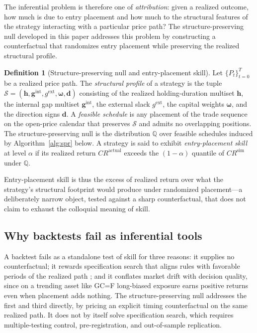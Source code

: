 \documentclass[preprint,12pt]{elsarticle}
\theoremstyle{definition}
\newtheorem{definition}{Definition}
\begin{document}
The inferential problem is therefore one of \emph{attribution}: given a realized outcome, how much is due to entry placement and how much to the structural features of the strategy interacting with a particular price path? The structure-preserving null developed in this paper addresses this problem by constructing a counterfactual that randomizes entry placement while preserving the realized structural profile.

\begin{definition}[Structure-preserving null and entry-placement skill]
Let $\{P_t\}_{t=0}^{T}$ be a realized price path. The \emph{structural profile} of a strategy is the tuple $\mathcal{S} = (\mathbf{h}, \mathbf{g}^{\mathrm{int}}, g^{\mathrm{ext}}, \boldsymbol{\omega}, \mathbf{d})$ consisting of the realized holding-duration multiset $\mathbf{h}$, the internal gap multiset $\mathbf{g}^{\mathrm{int}}$, the external slack $g^{\mathrm{ext}}$, the capital weights $\boldsymbol{\omega}$, and the direction signs $\mathbf{d}$. A \emph{feasible schedule} is any placement of the trade sequence on the open-price calendar that preserves $\mathcal{S}$ and admits no overlapping positions. The structure-preserving null is the distribution $\mathbb{Q}$ over feasible schedules induced by Algorithm~\ref{alg:spr} below. A strategy is said to exhibit \emph{entry-placement skill} at level $\alpha$ if its realized return $CR^{\mathrm{actual}}$ exceeds the $(1-\alpha)$ quantile of $CR^{\mathrm{sim}}$ under $\mathbb{Q}$.
\end{definition}

Entry-placement skill is thus the excess of realized return over what the strategy's structural footprint would produce under randomized placement---a deliberately narrow object, tested against a sharp counterfactual, that does not claim to exhaust the colloquial meaning of skill.

\subsection{Why backtests fail as inferential tools}

A backtest fails as a standalone test of skill for three reasons: it supplies no counterfactual; it rewards specification search that aligns rules with favorable periods of the realized path \cite{bailey2017}; and it conflates market drift with decision quality, since on a trending asset like GC=F long-biased exposure earns positive returns even when placement adds nothing. The structure-preserving null addresses the first and third directly, by pricing an explicit timing counterfactual on the same realized path. It does not by itself solve specification search, which requires multiple-testing control, pre-registration, and out-of-sample replication.
\end{document}

